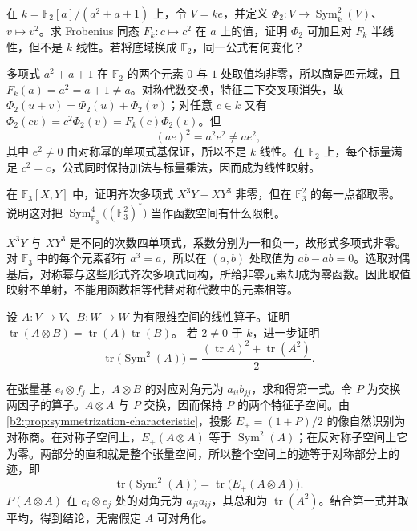 \begin{exercise}\label{b2:ex:08-frobenius-semilinear}
	在 \(k=\mathbb F_2[a]/(a^2+a+1)\) 上，令 \(V=ke\)，并定义 \(\Phi_2:V\rightarrow\operatorname{Sym}_k^2(V)\)、\(v\mapsto v^2\)。求 Frobenius 同态 \(F_k:c\mapsto c^2\) 在 \(a\) 上的值，证明 \(\Phi_2\) 可加且对 \(F_k\) 半线性，但不是 \(k\) 线性。若将底域换成 \(\mathbb F_2\)，同一公式有何变化？
\end{exercise}
\begin{solution}
	多项式 \(a^2+a+1\) 在 \(\mathbb F_2\) 的两个元素 \(0\) 与 \(1\) 处取值均非零，所以商是四元域，且 \(F_k(a)=a^2=a+1\ne a\)。对称代数交换，特征二下交叉项消失，故 \(\Phi_2(u+v)=\Phi_2(u)+\Phi_2(v)\)；对任意 \(c\in k\) 又有 \(\Phi_2(cv)=c^2\Phi_2(v)=F_k(c)\Phi_2(v)\)。但
	\[
		(ae)^2=a^2e^2\ne ae^2,
	\]
	其中 \(e^2\ne0\) 由对称幂的单项式基保证，所以不是 \(k\) 线性。在 \(\mathbb F_2\) 上，每个标量满足 \(c^2=c\)，公式同时保持加法与标量乘法，因而成为线性映射。
\end{solution}

\begin{exercise}\label{b2:ex:08-polynomial-versus-function}
	在 \(\mathbb F_3[X,Y]\) 中，证明齐次多项式 \(X^3Y-XY^3\) 非零，但在 \(\mathbb F_3^2\) 的每一点都取零。说明这对把 \(\operatorname{Sym}_{\mathbb F_3}^4\bigl((\mathbb F_3^2)^*\bigr)\) 当作函数空间有什么限制。
\end{exercise}
\begin{solution}
	\(X^3Y\) 与 \(XY^3\) 是不同的次数四单项式，系数分别为一和负一，故形式多项式非零。对 \(\mathbb F_3\) 中的每个元素都有 \(a^3=a\)，所以在 \((a,b)\) 处取值为 \(ab-ab=0\)。选取对偶基后，对称幂与这些形式齐次多项式同构，所给非零元素却成为零函数。因此取值映射不单射，不能用函数相等代替对称代数中的元素相等。
\end{solution}

\begin{exercise}\label{b2:ex:08-traces}
	设 \(A:V\rightarrow V\)、\(B:W\rightarrow W\) 为有限维空间的线性算子。证明 \(\operatorname{tr}(A\otimes B)=\operatorname{tr}(A)\operatorname{tr}(B)\)。 若 \(2\ne0\) 于 \(k\)，进一步证明
	\[
		\operatorname{tr}\bigl(\operatorname{Sym}^2(A)\bigr) =\frac{(\operatorname{tr}A)^2+\operatorname{tr}(A^2)}2.
	\]
\end{exercise}
\begin{solution}
	在张量基 \(e_i\otimes f_j\) 上，\(A\otimes B\) 的对应对角元为 \(a_{ii}b_{jj}\)，求和得第一式。令 \(P\) 为交换两因子的算子。\(A\otimes A\) 与 \(P\) 交换，因而保持 \(P\) 的两个特征子空间。由\cref{b2:prop:symmetrization-characteristic}，投影 \(E_+=(1+P)/2\) 的像自然识别为对称商。在对称子空间上，\(E_+(A\otimes A)\) 等于 \(\operatorname{Sym}^2(A)\)；在反对称子空间上它为零。两部分的直和就是整个张量空间，所以整个空间上的迹等于对称部分上的迹，即
	\[
		\operatorname{tr}\bigl(\operatorname{Sym}^2(A)\bigr) =\operatorname{tr}\bigl(E_+(A\otimes A)\bigr).
	\]
	\(P(A\otimes A)\) 在 \(e_i\otimes e_j\) 处的对角元为 \(a_{ji}a_{ij}\)，其总和为 \(\operatorname{tr}(A^2)\)。结合第一式并取平均，得到结论，无需假定 \(A\) 可对角化。
\end{solution}


